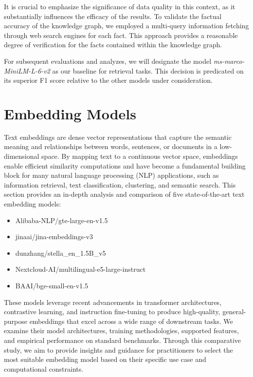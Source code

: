 It is crucial to emphasize the significance of data quality in this context, as it substantially influences the efficacy of the results.
To validate the factual accuracy of the knowledge graph, we employed a multi-query information fetching through web search engines for each fact.
This approach provides a reasonable degree of verification for the facts contained within the knowledge graph.

For subsequent evaluations and analyzes, we will designate the model \textit{ms-marco-MiniLM-L-6-v2} as our baseline for retrieval tasks.
This decision is predicated on its superior F1 score relative to the other models under consideration.


\section{Embedding Models}\label{sec:embedding-models}
Text embeddings are dense vector representations that capture the semantic meaning and relationships between words, sentences, or documents in a low-dimensional space.
By mapping text to a continuous vector space, embeddings enable efficient similarity computations and have become a fundamental building block for many natural language processing (NLP) applications, such as information retrieval, text classification, clustering, and semantic search.
This section provides an in-depth analysis and comparison of five state-of-the-art text embedding models:

\begin{itemize}
    \item Alibaba-NLP/gte-large-en-v1.5
    \item jinaai/jina-embeddings-v3
    \item dunzhang/stella\_en\_1.5B\_v5
    \item Nextcloud-AI/multilingual-e5-large-instruct
    \item BAAI/bge-small-en-v1.5
\end{itemize}

These models leverage recent advancements in transformer architectures, contrastive learning, and instruction fine-tuning to produce high-quality, general-purpose embeddings that excel across a wide range of downstream tasks.
We examine their model architectures, training methodologies, supported features, and empirical performance on standard benchmarks.
Through this comparative study, we aim to provide insights and guidance for practitioners to select the most suitable embedding model based on their specific use case and computational constraints.

